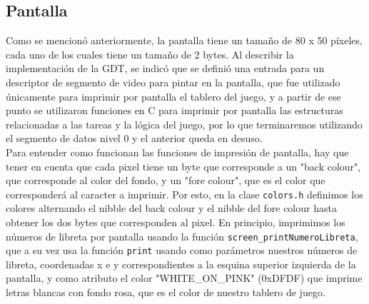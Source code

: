 \documentclass[a4paper]{article}
\begin{document}
\subsection{Pantalla}
Como se mencionó anteriormente, la pantalla tiene un tamaño de 80 x 50 píxeles, cada uno de los cuales tiene un tamaño de 2 bytes. Al describir la implementación de la GDT, se indicó que se definió una entrada para un descriptor de segmento de video para pintar en la pantalla, que fue utilizado únicamente para imprimir por pantalla el tablero del juego, y a partir de ese punto se utilizaron funciones en C para imprimir por pantalla las estructuras relacionadas a las tareas y la lógica del juego, por lo que terminaremos utilizando el segmento de datos nivel 0 y el anterior queda en desuso. \\
Para entender como funcionan las funciones de impresión de pantalla, hay que tener en cuenta que cada pixel tiene un byte que corresponde a un "back colour", que corresponde al color del fondo, y un "fore colour", que es el color que corresponderá al caracter a imprimir. Por esto, en la clase {\tt colors.h} definimos los colores alternando el nibble del back colour y el nibble del fore colour hasta obtener los dos bytes que corresponden al pixel. En principio, imprimimos los números de libreta por pantalla usando la función {\tt screen_printNumeroLibreta}, que a su vez usa la función {\tt print} usando como parámetros nuestros números de libreta, coordenadas x e y correspondientes a la esquina superior izquierda de la pantalla, y como atributo el color "WHITE_ON_PINK" (0xDFDF) que imprime letras blancas con fondo rosa, que es el color de nuestro tablero de juego. \\
\end{document}
